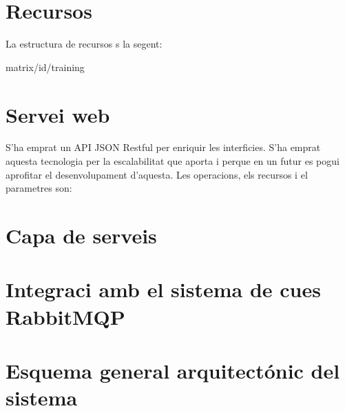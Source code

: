 \section{Recursos}
La estructura de recursos s la segent:

matrix/{id}/training

\section{Servei web}
S'ha emprat un API JSON Restful per enriquir les interficies. S'ha emprat aquesta tecnologia per la escalabilitat que aporta i perque en un futur es pogui aprofitar el desenvolupament d'aquesta.
Les operacions, els recursos i el parametres son:

\section{Capa de serveis}

\section{Integraci amb el sistema de cues RabbitMQP}

\section{Esquema general arquitect\'{o}nic del sistema}



